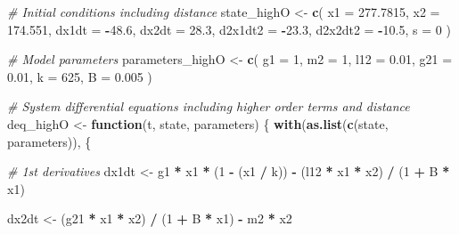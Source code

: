 \documentclass[12pt,twoside,openany]{reedthesis}
\newenvironment{Shaded}{\begin{snugshade}}{\end{snugshade}}
\newcommand{\KeywordTok}[1]{\textcolor[rgb]{0.13,0.29,0.53}{\textbf{#1}}}
\newcommand{\DataTypeTok}[1]{\textcolor[rgb]{0.13,0.29,0.53}{#1}}
\newcommand{\DecValTok}[1]{\textcolor[rgb]{0.00,0.00,0.81}{#1}}
\newcommand{\FloatTok}[1]{\textcolor[rgb]{0.00,0.00,0.81}{#1}}
\newcommand{\StringTok}[1]{\textcolor[rgb]{0.31,0.60,0.02}{#1}}
\newcommand{\CommentTok}[1]{\textcolor[rgb]{0.56,0.35,0.01}{\textit{#1}}}
\newcommand{\ControlFlowTok}[1]{\textcolor[rgb]{0.13,0.29,0.53}{\textbf{#1}}}
\newcommand{\OperatorTok}[1]{\textcolor[rgb]{0.81,0.36,0.00}{\textbf{#1}}}
\newcommand{\NormalTok}[1]{#1}
\begin{document}
\begin{Shaded}
\begin{Highlighting}[]
\CommentTok{# Initial conditions including distance}
\NormalTok{state_highO <-}\StringTok{ }\KeywordTok{c}\NormalTok{(}
  \DataTypeTok{x1 =} \FloatTok{277.7815}\NormalTok{, }
  \DataTypeTok{x2 =} \FloatTok{174.551}\NormalTok{,}
  \DataTypeTok{dx1dt =} \OperatorTok{-}\FloatTok{48.6}\NormalTok{,}
  \DataTypeTok{dx2dt =} \FloatTok{28.3}\NormalTok{,}
  \DataTypeTok{d2x1dt2 =} \OperatorTok{-}\FloatTok{23.3}\NormalTok{,}
  \DataTypeTok{d2x2dt2 =} \OperatorTok{-}\FloatTok{10.5}\NormalTok{,}
  \DataTypeTok{s =} \DecValTok{0}
\NormalTok{)}

\CommentTok{# Model parameters}
\NormalTok{parameters_highO <-}\StringTok{ }\KeywordTok{c}\NormalTok{(}
  \DataTypeTok{g1 =} \DecValTok{1}\NormalTok{,}
  \DataTypeTok{m2 =} \DecValTok{1}\NormalTok{,}
  \DataTypeTok{l12 =} \FloatTok{0.01}\NormalTok{,}
  \DataTypeTok{g21 =} \FloatTok{0.01}\NormalTok{,}
  \DataTypeTok{k =} \DecValTok{625}\NormalTok{,}
  \DataTypeTok{B =} \FloatTok{0.005}
\NormalTok{)}

\CommentTok{# System differential equations including higher order terms and distance}
\NormalTok{deq_highO <-}\StringTok{ }\ControlFlowTok{function}\NormalTok{(t, state, parameters) \{}
  \KeywordTok{with}\NormalTok{(}\KeywordTok{as.list}\NormalTok{(}\KeywordTok{c}\NormalTok{(state, parameters)), \{}
    
  \CommentTok{# 1st derivatives}
\NormalTok{  dx1dt <-}
\StringTok{  }\NormalTok{g1 }\OperatorTok{*}\StringTok{ }\NormalTok{x1 }\OperatorTok{*}\StringTok{ }\NormalTok{(}\DecValTok{1} \OperatorTok{-}\StringTok{ }\NormalTok{(x1 }\OperatorTok{/}\StringTok{ }\NormalTok{k)) }\OperatorTok{-}\StringTok{ }\NormalTok{(l12 }\OperatorTok{*}\StringTok{ }\NormalTok{x1 }\OperatorTok{*}\StringTok{ }\NormalTok{x2) }\OperatorTok{/}\StringTok{ }\NormalTok{(}\DecValTok{1} \OperatorTok{+}\StringTok{ }\NormalTok{B }\OperatorTok{*}\StringTok{ }\NormalTok{x1)}
  
\NormalTok{  dx2dt <-}\StringTok{ }\NormalTok{(g21 }\OperatorTok{*}\StringTok{ }\NormalTok{x1 }\OperatorTok{*}\StringTok{ }\NormalTok{x2) }\OperatorTok{/}\StringTok{ }\NormalTok{(}\DecValTok{1} \OperatorTok{+}\StringTok{ }\NormalTok{B }\OperatorTok{*}\StringTok{ }\NormalTok{x1) }\OperatorTok{-}\StringTok{ }\NormalTok{m2 }\OperatorTok{*}\StringTok{ }\NormalTok{x2}
  

\end{Highlighting}
\end{Shaded}
\end{document}
